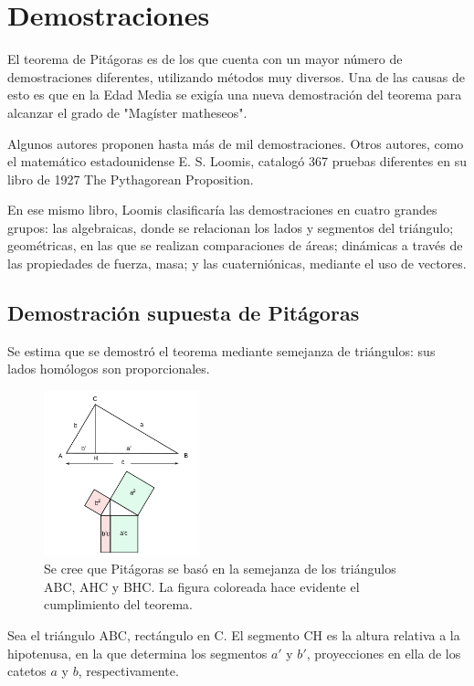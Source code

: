 \documentclass[12pt,letterpaper,twocolumn]{article}
\begin{document}
\section{Demostraciones}

El teorema de Pitágoras es de los que cuenta con un mayor número de demostraciones diferentes, utilizando métodos muy diversos. Una de las causas de esto es que en la Edad Media se exigía una nueva demostración del teorema para alcanzar el grado de "Magíster matheseos".

Algunos autores proponen hasta más de mil demostraciones. Otros autores, como el matemático estadounidense E. S. Loomis, catalogó 367 pruebas diferentes en su libro de 1927 The Pythagorean Proposition.

En ese mismo libro, Loomis clasificaría las demostraciones en cuatro grandes grupos: las algebraicas, donde se relacionan los lados y segmentos del triángulo; geométricas, en las que se realizan comparaciones de áreas; dinámicas a través de las propiedades de fuerza, masa; y las cuaterniónicas, mediante el uso de vectores.

\subsection{Demostración supuesta de Pitágoras}

Se estima que se demostró el teorema mediante semejanza de triángulos: sus lados homólogos son proporcionales.

\begin{figure}[h] 
	\centering
	\includegraphics[width=0.4\textwidth]{img/triangulos_pitagoras.png}
	\caption{Se cree que Pitágoras se basó en la semejanza de los triángulos ABC, AHC y BHC. La figura coloreada hace evidente el cumplimiento del teorema.}
\end{figure}



Sea el triángulo ABC, rectángulo en C. El segmento CH es la altura relativa a la hipotenusa, en la que determina los segmentos $a'$ y $b'$, proyecciones en ella de los catetos $a$ y $b$, respectivamente.
\end{document}
